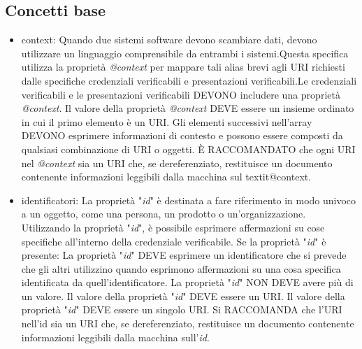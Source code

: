 \subsection{Concetti base}
\begin{itemize}
\item context: Quando due sistemi software devono scambiare dati, devono utilizzare un linguaggio comprensibile da entrambi i sistemi.Questa specifica utilizza la proprietà \textit{@context}  per mappare tali alias brevi agli URI richiesti dalle specifiche credenziali verificabili e presentazioni verificabili.Le credenziali verificabili e le presentazioni verificabili 
DEVONO includere una proprietà \textit{@context}. Il valore della proprietà \textit{@context} DEVE essere un insieme ordinato in cui il primo elemento è un URI. Gli elementi successivi nell'array DEVONO esprimere informazioni di contesto e possono essere composti da qualsiasi combinazione di 
URI o oggetti. È RACCOMANDATO che ogni URI nel \textit{@context} sia un URI che, se dereferenziato, restituisce un documento contenente informazioni leggibili dalla macchina sul textit{@context}.

\item identificatori: La proprietà "\textit{id}" è destinata a fare riferimento in modo univoco a un oggetto, come una persona, un prodotto o un'organizzazione. Utilizzando la proprietà "\textit{id}", 
è possibile esprimere affermazioni su cose specifiche all'interno della credenziale verificabile.
Se la proprietà "\textit{id}" è presente:
La proprietà "\textit{id}" DEVE esprimere un identificatore che si prevede che gli altri utilizzino quando esprimono affermazioni su una cosa specifica identificata da quell'identificatore.
La proprietà "\textit{id}" NON DEVE avere più di un valore.
Il valore della proprietà "\textit{id}" DEVE essere un URI.
Il valore della proprietà "\textit{id}" DEVE essere un singolo URI. Si RACCOMANDA che l'URI nell'id sia un URI che, se dereferenziato, restituisce un documento contenente informazioni 
leggibili dalla macchina sull'\textit{id}.


\end{itemize}
